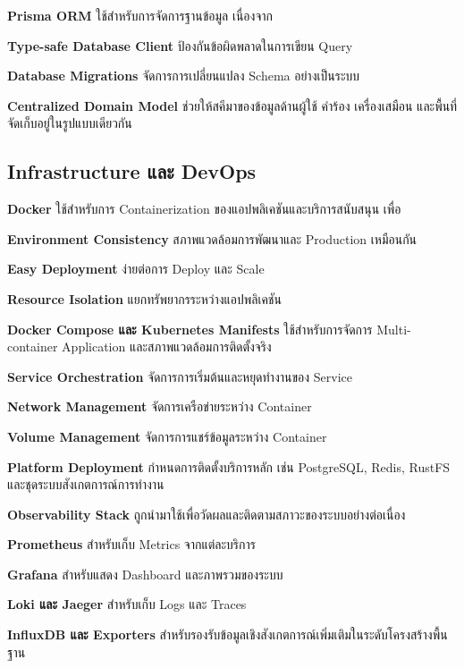 \hspace*{1.3em} %
\textbf{Prisma ORM} ใช้สำหรับการจัดการฐานข้อมูล เนื่องจาก
\begin{mycustomitem}
    \item \textbf{Type-safe Database Client} ป้องกันข้อผิดพลาดในการเขียน Query
    \item \textbf{Database Migrations} จัดการการเปลี่ยนแปลง Schema อย่างเป็นระบบ
    \item \textbf{Centralized Domain Model} ช่วยให้สคีมาของข้อมูลด้านผู้ใช้ คำร้อง เครื่องเสมือน และพื้นที่จัดเก็บอยู่ในรูปแบบเดียวกัน
\end{mycustomitem}

\subsection{Infrastructure และ DevOps}

\hspace*{1.3em} %
\textbf{Docker} ใช้สำหรับการ Containerization ของแอปพลิเคชันและบริการสนับสนุน เพื่อ
\begin{mycustomitem}
    \item \textbf{Environment Consistency} สภาพแวดล้อมการพัฒนาและ Production เหมือนกัน
    \item \textbf{Easy Deployment} ง่ายต่อการ Deploy และ Scale
    \item \textbf{Resource Isolation} แยกทรัพยากรระหว่างแอปพลิเคชัน
\end{mycustomitem}

\hspace*{1.3em} %
\textbf{Docker Compose และ Kubernetes Manifests} ใช้สำหรับการจัดการ Multi-container Application และสภาพแวดล้อมการติดตั้งจริง
\begin{mycustomitem}
    \item \textbf{Service Orchestration} จัดการการเริ่มต้นและหยุดทำงานของ Service
    \item \textbf{Network Management} จัดการเครือข่ายระหว่าง Container
    \item \textbf{Volume Management} จัดการการแชร์ข้อมูลระหว่าง Container
    \item \textbf{Platform Deployment} กำหนดการติดตั้งบริการหลัก เช่น PostgreSQL, Redis, RustFS และชุดระบบสังเกตการณ์การทำงาน
\end{mycustomitem}

\newpage
\hspace*{1.3em} %
\textbf{Observability Stack} ถูกนำมาใช้เพื่อวัดผลและติดตามสภาวะของระบบอย่างต่อเนื่อง
\begin{mycustomitem}
    \item \textbf{Prometheus} สำหรับเก็บ Metrics จากแต่ละบริการ
    \item \textbf{Grafana} สำหรับแสดง Dashboard และภาพรวมของระบบ
    \item \textbf{Loki และ Jaeger} สำหรับเก็บ Logs และ Traces
    \item \textbf{InfluxDB และ Exporters} สำหรับรองรับข้อมูลเชิงสังเกตการณ์เพิ่มเติมในระดับโครงสร้างพื้นฐาน
\end{mycustomitem}

